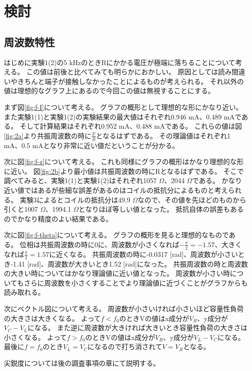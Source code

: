 \documentclass[11pt,a4paper,fleqn]{jsarticle}
\begin{document}
\section{検討}
\subsection{周波数特性}
はじめに実験1(2)の5 kHzのときRにかかる電圧が極端に落ちることについて考える。
この値は前後と比べてみても明らかにおかしい。
原因としては読み間違いやきちんと端子が接触しなかったことによるものが考えられる。
それ以外の値は理想的なグラフ上にあるので今回この値は無視することにする。

まず図\ref{fig:f-I}について考える。
グラフの概形として理想的な形にかなり近い。
また実験1(1)と実験1(2)の実験結果の最大値はそれぞれ0.946 mA、0.489 mAである。
そして計算結果はそれぞれ0.952 mA、0.488 mAである。
これらの値は図\ref{fig:2a}より共振周波数の時に$\frac{E}{R}$となるはずである。
その理論値はそれぞれ1 mA、0.5 mAとなり非常に近い値だということが分かる。

次に図\ref{fig:f-z}について考える。
これも同様にグラフの概形はかなり理想的な形に近い。
図\ref{fig:2b}より最小値は共振周波数の時にRとなるはずである。
そこで調べてみると、実験1(1)と実験1(2)はそれぞれ1057 $\Omega$、2044 $\Omega$である。
かなり近い値ではあるが些細な誤差があるのはコイルの抵抗分によるものと考えられる。
実験3によるとコイルの抵抗分は49.9 $\Omega$なので、その値を先ほどのものから引くと1007 $\Omega$、1994.1 $\Omega$となりほぼ等しい値となった。
抵抗自体の誤差もあるのでかなり精度のよい結果である。

次に図\ref{fig:f-theta}について考える。
グラフの概形を見ると理想的なものである。
位相は共振周波数の時に0に、周波数が小さくなれば$-\frac{\pi}{2}=-1.57$、大きくなれば$\frac{\pi}{2}=1.57$に近くなる。
共振周波数の時に-0.0317 [rad]、周波数が小さいとき-1.41 [rad]、周波数が大きいとき1.52 [rad]になった。
共振周波数の時と周波数の大きい時についてはかなり理論値に近い値となった。
周波数が小さい時についてもさらに周波数を小さくすることでより理論値に近づくことがグラフからも読み取れる。

次にベクトル図について考える。
周波数が小さいければ小さいほど容量性負荷の大きさは大きくなる。
よって$f<f_{0}$のときVの値はx成分が$V_{R}$、y成分が$V_{C}-V_{L}$になる。
また逆に周波数が大きければ大きいとき容量性負荷の大きさは小さくなる。
よって$f>f_{0}$のときVの値はx成分が$V_{R}$、y成分が$V_{L}-V_{C}$になる。
最後に$f=f_{0}$のとき$V_{L}=V_{C}$になるので打ち消されて$V=V_{R}$となる。

尖鋭度については後の調査事項の章にて説明する。
\end{document}
